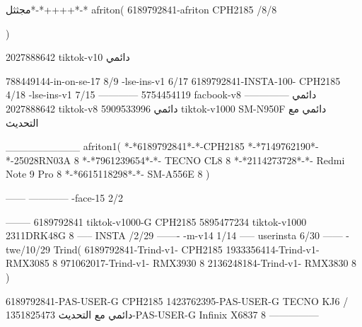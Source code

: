 مجثثل*-*++++*-*
afriton(
6189792841-afriton CPH2185  /8/8

)

2027888642 tiktok-v10
دائمي

788449144-in-on-se-17 8/9
-lse-ins-v1 6/17
6189792841-INSTA-100- CPH2185 4/18
-lse-ins-v1 7/15
------------
5754454119 facbook-v8
دائمي
--------------
2027888642 tiktok-v8
دائمي
5909533996 tiktok-v1000  SM-N950F
دائمي مع التحديث

__________
afriton1(
*-*6189792841*-*-CPH2185
*-*7149762190*-*-25028RN03A  8
*-*7961239654*-*- TECNO CL8  8
*-*2114273728*-*- Redmi Note 9 Pro  8
*-*6615118298*-*- SM-A556E  8
)


------
------------
-face-15 2/2

--------
6189792841 tiktok-v1000-G CPH2185 
5895477234 tiktok-v1000 2311DRK48G 8
-----
 INSTA /2/29
-------
-m-v14 1/14
-----
userinsta 6/30
------
-twe/10/29
Trind(
6189792841-Trind-v1- CPH2185 
1933356414-Trind-v1- RMX3085 8
971062017-Trind-v1- RMX3930 8
2136248184-Trind-v1- RMX3830 8
)


6189792841-PAS-USER-G CPH2185 
1423762395-PAS-USER-G TECNO KJ6  /دائمي مع التحديث
1351825473-PAS-USER-G Infinix X6837 8
    ---------------
